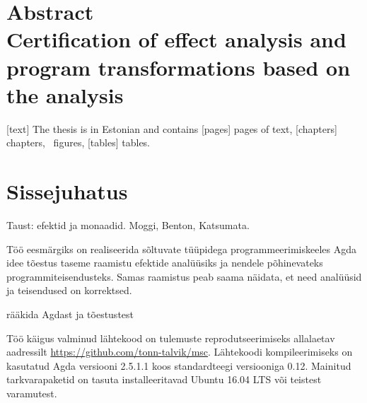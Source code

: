 \documentclass[a4paper,12pt]{article}
\begin{document}
\section*{\vskip 60pt\centering Abstract\\
Certification of effect analysis and program transformations based on the analysis}
[text]
The thesis is in Estonian and contains [pages] pages of text, [chapters] chapters, \totalfigures\ figures, [tables] tables.
\clearpage

\tableofcontents
\clearpage

\listoffigures
\clearpage







\section{Sissejuhatus}

Taust: efektid ja monaadid. Moggi, Benton, Katsumata.


Töö eesmärgiks on realiseerida sõltuvate tüüpidega programmeerimiskeeles Agda idee tõestus taseme
raamistu efektide analüüsiks ja nendele põhinevateks programmiteisendusteks.
Samas raamistus peab saama näidata, et need analüüsid ja teisendused on korrektsed.



rääkida Agdast ja tõestustest

Töö käigus valminud lähtekood on tulemuste reprodutseerimiseks allalaetav aadressilt \url{https://github.com/tonn-talvik/msc}.
Lähtekoodi kompileerimiseks on kasutatud Agda versiooni 2.5.1.1 koos standardteegi versiooniga 0.12.
Mainitud tarkvarapaketid on tasuta installeeritavad Ubuntu 16.04 LTS või teistest varamutest.
\end{document}
